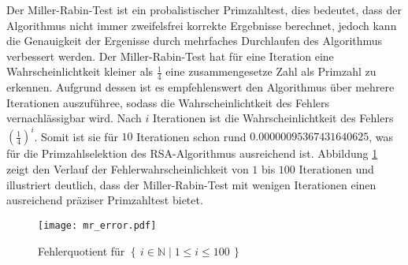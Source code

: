 Der Miller-Rabin-Test ist ein probalistischer Primzahltest, dies bedeutet, dass der Algorithmus nicht immer zweifelsfrei korrekte Ergebnisse berechnet, jedoch kann die Genauigkeit der Ergenisse durch mehrfaches Durchlaufen des Algorithmus verbessert werden.
Der Miller-Rabin-Test hat für eine Iteration eine Wahrscheinlichtkeit kleiner als $\frac{1}{4}$ eine zusammengesetze Zahl als Primzahl zu erkennen. Aufgrund dessen ist es empfehlenswert den Algorithmus über mehrere Iterationen auszuführee, sodass die Wahrscheinlichtkeit des Fehlers vernachlässigbar wird.
Nach $i$ Iterationen ist die Wahrscheinlichtkeit des Fehlers $(\frac{1}{4})^i$. Somit ist sie für $10$ Iterationen schon rund $0.00000095367431640625$, was für die Primzahlselektion des RSA-Algorithmus ausreichend ist. Abbildung \ref{mr_error} zeigt den Verlauf der Fehlerwahrscheinlichkeit von $1$ bis $100$ Iterationen und illustriert deutlich, dass der Miller-Rabin-Test mit wenigen Iterationen einen ausreichend präziser Primzahltest bietet.

\begin{figure}[ht]
  \texttt{[image: mr\_error.pdf]}
  \label{mr_error}
  \caption{Fehlerquotient für $\left\{\,i \in \mathbb{N}\mid 1 \le i \le 100 \, \right\}$}
\end{figure}
